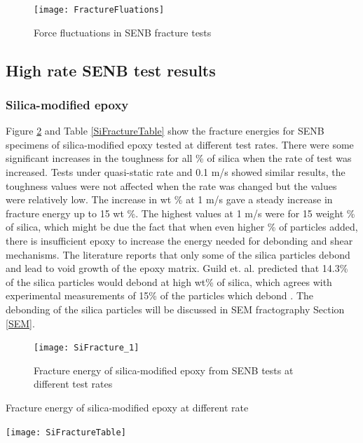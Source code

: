 \documentclass[numbers=noendperiod,chapterprefix=on]{icldt} %
\begin{document}

\begin{figure}[!htpb]
\centering
\texttt{[image: FractureFluations]}
\caption{Force fluctuations in SENB fracture tests \cite{ISO13586}} \label{FractureFluations}
\end{figure}
\FloatBarrier

\subsection{High rate SENB test results}

\subsubsection{Silica-modified epoxy}
Figure \ref{SiFracture_1} and Table \ref{SiFractureTable} show the fracture energies for SENB specimens of silica-modified epoxy tested at different test rates. There were some significant increases in the toughness for all \% of silica when the rate of test was increased. Tests under quasi-static rate and 0.1 m/s showed similar results, the toughness values were not affected when the rate was changed but the values were relatively low. 
The increase in wt \% at 1 m/s gave a steady increase in fracture energy up to 15 wt \%.
The highest values at 1 m/s were for 15 weight \% of silica, which might be due the fact that when even higher \% of particles added, there is insufficient epoxy to increase the energy needed for debonding and shear mechanisms. The literature reports that only some of the silica particles debond and lead to void growth of the epoxy matrix. Guild et. al. \cite{Hsieh2010a} predicted that 14.3\% of the silica particles would debond at high wt\% of silica, which agrees with experimental measurements of 15\% of the particles which debond \cite{Mohammed2007}.
The debonding of the silica particles will be discussed in SEM fractography Section \ref{SEM}. 

\begin{figure}[!htpb]
\centering
\texttt{[image: SiFracture\_1]}
\caption{Fracture energy of silica-modified epoxy from SENB tests at different test rates} \label{SiFracture_1}
\end{figure}
\FloatBarrier

\begin{table}[!htpb]
\centering
\caption{Fracture energy of silica-modified epoxy at different rate} \label{SiFractureTable}
\texttt{[image: SiFractureTable]}
\end{table}
\FloatBarrier
\end{document}
